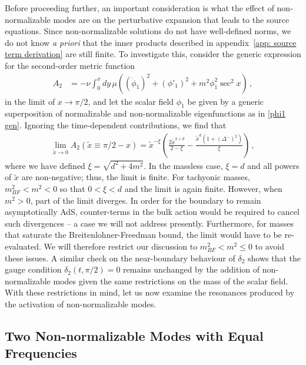 \documentclass[../PhD.tex]{subfiles}
\begin{document}
Before proceeding further, an important consideration is what the effect of non-normalizable modes are on the perturbative expansion that leads to the source equations. Since non-normalizable solutions do not have well-defined norms, we do not know \emph{a priori} that the inner products described in appendix~\ref{app: source term derivation} are still finite. To investigate this, consider the generic expression for the second-order metric function
\begin{align}
A_2 &= - \nu \int^x_0 dy \, \mu \left( (\dot \phi_1)^2 + (\phi'_1)^2 + m^2 \phi_1^2 \sec^2 x \right) \, ,
\end{align}
in the limit of $x \to \pi/2$, and let the scalar field $\phi_1$ be given by a generic superposition of normalizable and non-normalizable eigenfunctions as in \eqref{phi1 gen}. Ignoring the time-dependent contributions, we find that
\begin{align}
\lim_{\tilde x \to 0} A_2 (\tilde x \equiv \pi /2 - x) = \tilde{x}^{-\xi} \left( \frac{2 \tilde{x}^{2+d}}{2 - \xi} - \frac{\tilde{x}^d (1 + \left(\Delta^{-}\right)^2)}{\xi} \right) \, ,
\end{align}
where we have defined $\xi = \sqrt{d^2 + 4m^2}$. In the massless case, $\xi = d$ and all powers of $\tilde{x}$ are non-negative; thus, the limit is finite. For tachyonic masses, $m^2_{BF} < m^2 < 0$ so that $0 < \xi < d$ and the limit is again finite. However, when $m^2 > 0$, part of the limit diverges. In order for the boundary to remain asymptotically AdS, counter-terms in the bulk action would be required to cancel such divergences -- a case we will not address presently. Furthermore, for masses that saturate the Breitenlohner-Freedman bound, the limit would have to be re-evaluated. We will therefore restrict our discussion to $m^2_{BF} < m^2 \leq 0$ to avoid these issues. A similar check on the near-boundary behaviour of $\delta_2$ shows that the gauge condition ${\delta_2 (t, \pi/2) = 0}$ remains unchanged by the addition of non-normalizable modes given the same restrictions on the mass of the scalar field. With these restrictions in mind, let us now examine the resonances produced by the activation of non-normalizable modes.

\subsection{Two Non-normalizable Modes with Equal Frequencies}
\label{ssec: equalNN}
\end{document}
